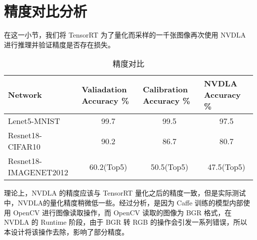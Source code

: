 \section{精度对比分析}

在这一小节，我们将 TensorRT 为了量化而采样的一千张图像再次使用 NVDLA 进行推理并验证精度是否存在损失。

\begin{table}[!htbp]
    \caption{精度对比}
    \label{tab:Qualifications Report}
    \centering
    \footnotesize%
    \setlength{\tabcolsep}{4pt}%
    \renewcommand{\arraystretch}{1.2}%
    \begin{tabular}{lccc}
        \toprule
        \textbf{Network}      & \multicolumn{1}{l}{\textbf{Valiadation Accuracy \%}} & \multicolumn{1}{l}{\textbf{Calibration Accuracy \%}}  & \multicolumn{1}{l}{\textbf{NVDLA Accuracy \%}} \\
        \midrule
        Lenet5-MNIST          & 99.7                                                 & 99.5                                                 & 97.5                                                 \\  
        Resnet18-CIFAR10      & 90.2                                                 & 86.7                                                 & 80.7                                                 \\
        Resnet18-IMAGENET2012 & 60.2(Top5)                                           & 50.5(Top5)                                           & 47.5(Top5)                                           \\
        \bottomrule                   
    \end{tabular}
\end{table}

理论上，NVDLA 的精度应该与 TensorRT 量化之后的精度一致，但是实际测试中，NVDLA的量化精度稍微低一些。经过分析，是因为 Caffe 训练的模型内部使用 OpenCV 进行图像读取操作，而 OpenCV 读取的图像为 BGR 格式，在 NVDLA 的 Runtime 阶段，由于 BGR 转 RGB 的操作会引发一系列错误，所以本设计将该操作去除，影响了部分精度。

\section{}